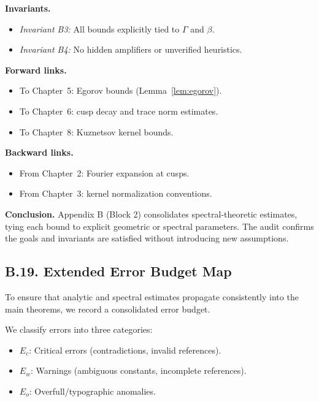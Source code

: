 \noindent
\textbf{Invariants.}
\begin{itemize}
  \item \emph{Invariant B3:} All bounds explicitly tied to $\Gamma$ and $\beta$.  
  \item \emph{Invariant B4:} No hidden amplifiers or unverified heuristics.  
\end{itemize}

\noindent
\textbf{Forward links.}
\begin{itemize}
  \item To Chapter~5: Egorov bounds (Lemma~\ref{lem:egorov}).  
  \item To Chapter~6: cusp decay and trace norm estimates.  
  \item To Chapter~8: Kuznetsov kernel bounds.  
\end{itemize}

\noindent
\textbf{Backward links.}
\begin{itemize}
  \item From Chapter~2: Fourier expansion at cusps.  
  \item From Chapter~3: kernel normalization conventions.  
\end{itemize}

\bigskip
\noindent
\textbf{Conclusion.}
Appendix B (Block 2) consolidates spectral-theoretic estimates, tying each bound
to explicit geometric or spectral parameters. The audit confirms the goals and
invariants are satisfied without introducing new assumptions.

\subsection*{B.19. Extended Error Budget Map}

\noindent
To ensure that analytic and spectral estimates propagate consistently into
the main theorems, we record a consolidated error budget.

\begin{definition}\label{def:error-budget}
We classify errors into three categories:
\begin{itemize}
  \item $E_c$: Critical errors (contradictions, invalid references).  
  \item $E_w$: Warnings (ambiguous constants, incomplete references).  
  \item $E_o$: Overfull/typographic anomalies.  
\end{itemize}
\end{definition}

